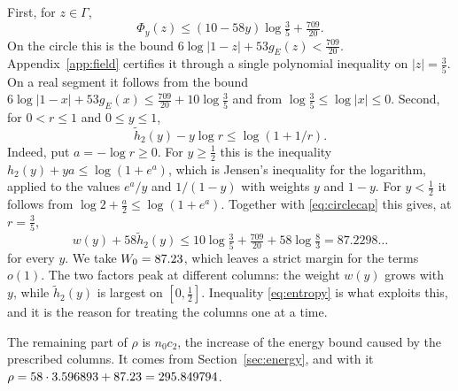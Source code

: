 First, for $z\in\Gamma$,
\begin{equation}\label{eq:circlecap}
 \Phi_y(z)\le(10-58y)\log\tfrac35+\tfrac{709}{20} .
\end{equation}
On the circle this is the bound $6\log|1-z|+53g_E(z)<\frac{709}{20}$. Appendix~\ref{app:field} certifies it through
a single polynomial inequality on $|z|=\frac35$. On a real segment it follows from the bound
$6\log|1-x|+53g_E(x)\le\frac{709}{20}+10\log\frac35$ and from $\log\frac35\le\log|x|\le0$. Second, for $0<r\le1$ and $0\le y\le1$,
\begin{equation}\label{eq:entropy}
 \tilde h_2(y)-y\log r\le\log(1+1/r) .
\end{equation}
Indeed, put $a=-\log r\ge0$. For $y\ge\frac12$ this is the inequality $h_2(y)+ya\le\log(1+e^a)$, which is
Jensen's inequality for the logarithm, applied to the values $e^a/y$ and $1/(1-y)$ with weights $y$ and $1-y$.
For $y<\frac12$ it follows from $\log2+\frac a2\le\log(1+e^a)$. Together with \eqref{eq:circlecap} this gives, at
$r=\frac35$,
\[
 w(y)+58\tilde h_2(y)\le10\log\tfrac35+\tfrac{709}{20}+58\log\tfrac83=87.2298\ldots
\]
for every $y$. We take $W_0=87.23$, which leaves a strict margin for the terms $o(1)$. The two factors peak at
different columns: the weight $w(y)$ grows with $y$, while $\tilde h_2(y)$ is largest on $[0,\frac12]$.
Inequality \eqref{eq:entropy} is what exploits this, and it is the reason for treating the columns one at a time.

The remaining part of $\rho$ is $n_0c_2$, the increase of the energy bound caused by the prescribed
columns. It comes from Section~\ref{sec:energy}, and with it $\rho=58\cdot3.596893+87.23=295.849794$.
